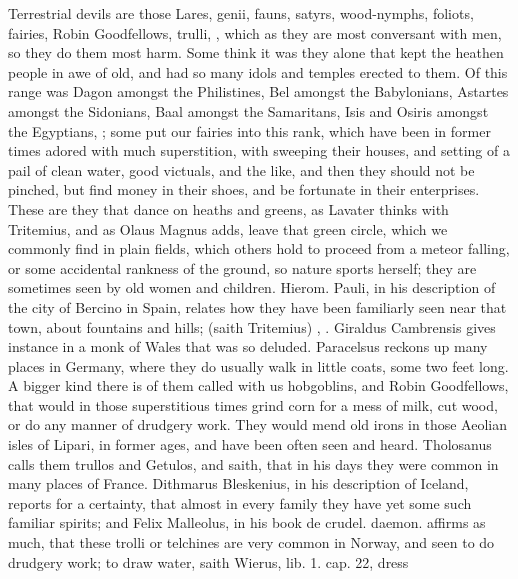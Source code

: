 {{Terrestrial devils are those Lares, genii, fauns, satyrs, 
wood-nymphs, foliots, fairies, Robin Goodfellows, trulli, \etc{}, which as
they are most conversant with men, so they do them most harm. Some
think it was they alone that kept the heathen people in awe of old, and
had so many idols and temples erected to them. Of this range was Dagon
amongst the Philistines, Bel amongst the Babylonians, Astartes amongst
the Sidonians, Baal amongst the Samaritans, Isis and Osiris amongst the
Egyptians, \etc{}; some put our fairies into this rank, which have
been in former times adored with much superstition, with sweeping their
houses, and setting of a pail of clean water, good victuals, and the
like, and then they should not be pinched, but find money in their
shoes, and be fortunate in their enterprises. These are they that dance
on heaths and greens, as Lavater thinks with Tritemius, and as
Olaus Magnus adds, leave that green circle, which we commonly
find in plain fields, which others hold to proceed from a meteor
falling, or some accidental rankness of the ground, so nature sports
herself; they are sometimes seen by old women and children. Hierom.
Pauli, in his description of the city of Bercino in Spain, relates how
they have been familiarly seen near that town, about fountains and
hills;  (saith Tritemius) , \etc{}. Giraldus Cambrensis gives
instance in a monk of Wales that was so deluded. Paracelsus
reckons up many places in Germany, where they do usually walk in little
coats, some two feet long. A bigger kind there is of them called with
us hobgoblins, and Robin Goodfellows, that would in those superstitious
times grind corn for a mess of milk, cut wood, or do any manner of
drudgery work. They would mend old irons in those Aeolian isles of
Lipari, in former ages, and have been often seen and heard.
Tholosanus calls them trullos and Getulos, and saith, that in his
days they were common in many places of France. Dithmarus Bleskenius,
in his description of Iceland, reports for a certainty, that almost in
every family they have yet some such familiar spirits; and Felix
Malleolus, in his book de crudel. daemon. affirms as much, that these
trolli or telchines are very common in Norway, and seen to do
drudgery work; to draw water, saith Wierus, lib. 1. cap. 22, dress
}}
